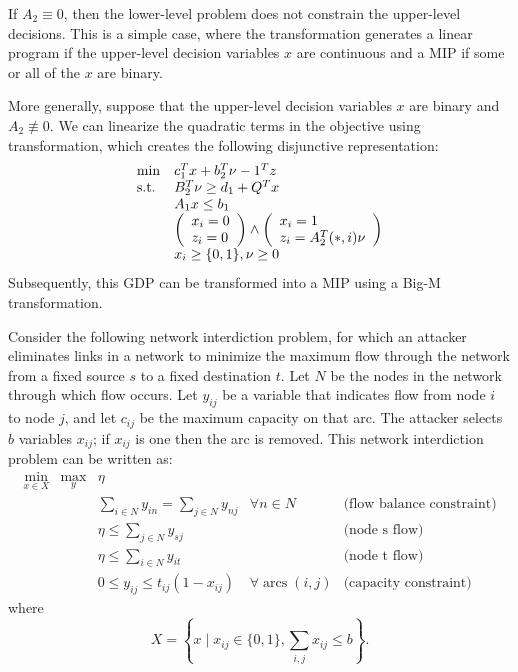 If $A_2 \equiv 0$, then the lower-level problem does
not constrain the upper-level decisions.  This is a simple case, where the transformation
generates a linear program if the upper-level decision variables
$x$ are continuous and a MIP if some or all of the $x$ are binary.

More generally, suppose that the upper-level decision variables $x$ are
binary and $A_2 \not \equiv 0$.  We can linearize the quadratic terms
in the objective using  transformation, which
creates the following disjunctive representation:
\begin{equation}
\begin{array}{ll}
\min & c^T_1 x + b^T_2 \nu - 1^T z\\
\textrm{s.t.}  & B^T_2 \nu \geq d_1 + Q^T x\\
     & A_1 x \leq b_1\\
     & \left(\begin{array}{l}
       x_i = 0\\
       z_i = 0
       \end{array}\right) \wedge \left(\begin{array}{l}
       x_i = 1\\
       z_i = A^T_2(*,i) \nu
       \end{array}\right)\\
     & x_i \geq \{0,1\},  \nu \geq 0
\end{array}
\end{equation}
Subsequently, this GDP can be transformed into a MIP using a Big-M transformation.

Consider the following network interdiction problem, for which an
attacker eliminates links in a network to minimize the maximum flow
through the network from a fixed source $s$ to a fixed destination
$t$.  Let $N$ be the nodes in the network through which flow occurs.
Let $y_{ij}$ be a variable that indicates flow from node $i$
to node $j$, and let $c_{ij}$ be the maximum capacity on that arc.  The attacker selects 
$b$ variables $x_{ij}$; if $x_{ij}$ is one then the arc is removed.  This network interdiction problem can be
written as:
\begin{equation}
\begin{array}{lllll}
\min_{x \in X} & \max_{y} & \eta & & \\
    & & \sum_{i \in N} y_{in} = \sum_{j \in N} y_{nj} & \forall n \in N & \textrm{(flow balance constraint)}\\
    & & \eta \leq \sum_{j \in N} y_{sj} & & \textrm{(node s flow)}\\
    & & \eta \leq \sum_{i \in N} y_{it} & & \textrm{(node t flow)}\\
    & & 0 \leq y_{ij} \leq t_{ij} (1-x_{ij}) & \forall \;\textrm{arcs}\; (i,j) & \textrm{(capacity constraint)}
\end{array}
\end{equation}
where
\[
X = \left\{x \mid x_{ij} \in \{0,1\}, \sum_{i,j} x_{ij} \leq b\right\}.
\]

